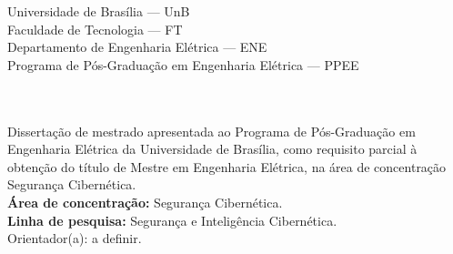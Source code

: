 \documentclass[
  12pt,
  a4paper,
  oneside,        %
  brazil
]{abntex2}
\begin{document}
\renewcommand{\baselinestretch}{1.2}\normalsize

\pretextual

\imprimircapa

\begin{folhaderosto*}
  \begin{center}
    {\ABNTEXchapterfont\large Universidade de Brasília — UnB}\\
    {\ABNTEXchapterfont Faculdade de Tecnologia — FT}\\
    {\ABNTEXchapterfont Departamento de Engenharia Elétrica — ENE}\\
    {\ABNTEXchapterfont Programa de Pós-Graduação em Engenharia Elétrica — PPEE}\\[3cm]

    {\ABNTEXchapterfont\large\imprimirautor}\\[3cm]

    {\ABNTEXchapterfont\bfseries\Large\imprimirtitulo}\\[3cm]
  \end{center}

  \hspace{.45\textwidth}
  \begin{minipage}{.5\textwidth}
    \SingleSpacing
    Dissertação de mestrado apresentada ao Programa de
    Pós-Graduação em Engenharia Elétrica da Universidade de
    Brasília, como requisito parcial à obtenção do título de
    Mestre em Engenharia Elétrica, na área de concentração
    Segurança Cibernética.\\[0.4cm]
    \textbf{Área de concentração:} Segurança Cibernética.\\
    \textbf{Linha de pesquisa:} Segurança e Inteligência Cibernética.\\[0.4cm]
    Orientador(a): a definir.
  \end{minipage}
  \vfill
  \begin{center}
    \imprimirlocal\\
    \imprimirdata
  \end{center}
\end{folhaderosto*}
\end{document}
